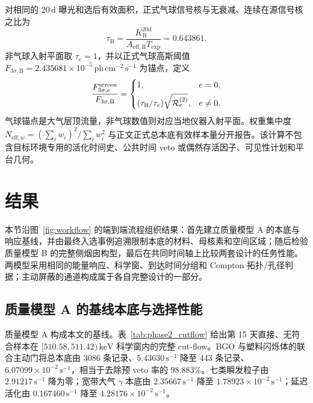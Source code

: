 \documentclass[11pt]{article}
\newcommand{\keV}{\,\mathrm{keV}}
\newcommand{\phcms}{\,\mathrm{ph\,cm^{-2}\,s^{-1}}}
\newcommand{\cps}{\,\mathrm{s^{-1}}}
\begin{document}
对相同的 20\,d 曝光和选后有效面积，正式气球信号核与无衰减、连续在源信号核之比为
\begin{equation}
 \tau_{\mathrm B}=
 \frac{K_{\mathrm B}^{20\mathrm d}}
 {A_{\mathrm{eff,B}}T_{\mathrm{exp}}}=0.643861 .
 \label{eq:environment_signal_factor}
\end{equation}
非气球入射平面取 $\tau_e=1$，并以正式气球高斯阈值 $F_{3\sigma,\mathrm B}=2.435681\times10^{-5}\phcms$ 为锚点，定义
\begin{equation}
 \frac{F_{3\sigma,e}^{\mathrm{screen}}}{F_{3\sigma,\mathrm B}}=
 \begin{cases}
  1, & e=0,\\[3pt]
  (\tau_{\mathrm B}/\tau_e)\sqrt{{\cal R}^{(2)}_e}, & e\ne0 .
 \end{cases}
 \label{eq:environment_flux_screen}
\end{equation}
气球锚点是大气层顶流量，非气球数值则对应当地仪器入射平面。权重集中度 $N_{\mathrm{eff},w}=(\sum_iw_i)^2/\sum_iw_i^2$ 与正文正式总本底有效样本量分开报告。该计算不包含目标环境专用的活化时间史、公共时间 veto 或偶然存活因子、可见性计划和平台几何。

\section{结果}
\label{sec:results}

本节沿图~\ref{fig:workflow} 的端到端流程组织结果：首先建立质量模型 A 的本底与响应基线，并由最终入选事例追溯限制本底的材料、母核素和空间区域；随后检验质量模型 B 的完整侧烟囱构型，最后在共同时间轴上比较两套设计的任务性能。两模型采用相同的能量响应、科学窗、到达时间分组和 Compton 拓扑/孔径判据；主动屏蔽的通道构成属于各自完整设计的一部分。

\subsection{质量模型 A 的基线本底与选择性能}
\label{subsec:model_a_baseline_zh}
\label{subsec:reference_background_results_zh}

质量模型 A 构成本文的基线。表~\ref{tab:phase2_cutflow} 给出第 15 天直接、无符合样本在 $[510.58,511.42)\keV$ 科学窗内的完整 cut-flow。BGO 与塑料闪烁体的联合主动门将总本底由 3086 条记录、$5.43630\cps$ 降至 443 条记录、$6.07099\times10^{-2}\cps$，相当于去除预 veto 率的 $98.883\%$。七类瞬发粒子由 $2.91217\cps$ 降为零；宽带大气 $\gamma$ 本底由 $2.35667\cps$ 降至 $1.78923\times10^{-2}\cps$；延迟活化由 $0.167460\cps$ 降至 $4.28176\times10^{-2}\cps$。
\end{document}
